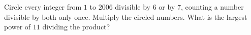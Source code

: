 Circle every integer from $1$ to $2006$ divisible by $6$ or by $7$, counting a number divisible by both only once. Multiply the circled numbers. What is the largest power of $11$ dividing the product?
